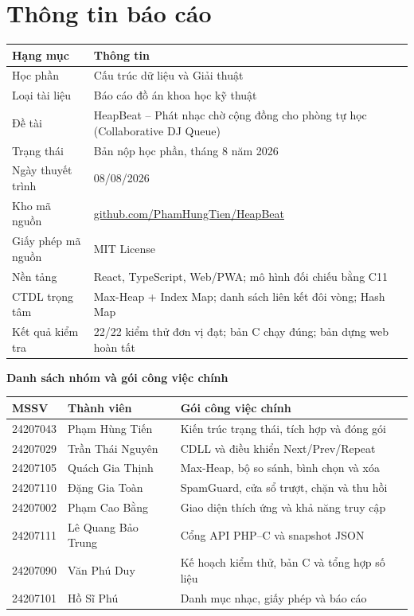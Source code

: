 \documentclass[12pt,a4paper,twoside,openright]{report}
\begin{document}
\thispagestyle{empty}
\chapter*{Thông tin báo cáo}

\renewcommand{\arraystretch}{1.24}
\begin{tabularx}{\textwidth}{@{}p{3.55cm}X@{}}
\toprule
\textbf{Hạng mục} & \textbf{Thông tin}\\
\midrule
Học phần & Cấu trúc dữ liệu và Giải thuật\\
Loại tài liệu & Báo cáo đồ án khoa học kỹ thuật\\
Đề tài & HeapBeat -- Phát nhạc chờ cộng đồng cho phòng tự học
(Collaborative DJ Queue)\\
Trạng thái & Bản nộp học phần, tháng 8 năm 2026\\
Ngày thuyết trình & 08/08/2026\\
Kho mã nguồn & \href{https://github.com/PhamHungTien/HeapBeat}{github.com/PhamHungTien/HeapBeat}\\
Giấy phép mã nguồn & MIT License\\
Nền tảng & React, TypeScript, Web/PWA; mô hình đối chiếu bằng C11\\
CTDL trọng tâm & Max-Heap + Index Map; danh sách liên kết đôi vòng; Hash Map\\
Kết quả kiểm tra & 22/22 kiểm thử đơn vị đạt; bản C chạy đúng; bản dựng web hoàn tất\\
\bottomrule
\end{tabularx}

\vspace{0.72cm}
{\sffamily\large\bfseries\color{hbnavy}Danh sách nhóm và gói công việc chính\par}
\vspace{0.1cm}
\begin{tabularx}{\textwidth}{@{}p{2.05cm}p{3.75cm}X@{}}
\toprule
\textbf{MSSV} & \textbf{Thành viên} & \textbf{Gói công việc chính}\\
\midrule
24207043 & Phạm Hùng Tiến & Kiến trúc trạng thái, tích hợp và đóng gói\\
24207029 & Trần Thái Nguyên & CDLL và điều khiển Next/Prev/Repeat\\
24207105 & Quách Gia Thịnh & Max-Heap, bộ so sánh, bình chọn và xóa\\
24207110 & Đặng Gia Toàn & SpamGuard, cửa sổ trượt, chặn và thu hồi\\
24207002 & Phạm Cao Bằng & Giao diện thích ứng và khả năng truy cập\\
24207111 & Lê Quang Bảo Trung & Cổng API PHP--C và snapshot JSON\\
24207090 & Văn Phú Duy & Kế hoạch kiểm thử, bản C và tổng hợp số liệu\\
24207101 & Hồ Sĩ Phú & Danh mục nhạc, giấy phép và báo cáo\\
\bottomrule
\end{tabularx}
\end{document}
